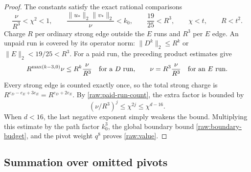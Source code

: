 \documentclass[11pt]{amsart}
\theoremstyle{definition}
\theoremstyle{remark}
\numberwithin{equation}{section}
\begin{document}
\begin{proof}
The constants satisfy the exact rational comparisons
\[
 \frac{\nu}{R^3}<\chi^2<1,\qquad
 \frac{\|u_*\|_2\|v_*\|_2}{\nu}<k_0,\qquad
 \frac{19}{25}<R^3,\qquad \chi<t,\qquad R<t^2.
\]
Charge $R$ per ordinary strong edge outside the $E$ runs and $R^3$
per $E$ edge.  An unpaid run is covered by its operator norm:
$\|D^k\|_2\le R^k$ or $\|E\|_2<19/25<R^3$.
For a paid run, the preceding product estimates give
\[
 R^{\max(k-3,0)}\nu\le R^k\frac{\nu}{R^3}
 \quad\hbox{for a $D$ run},\qquad
 \nu=R^3\frac{\nu}{R^3}\quad\hbox{for an $E$ run}.
\]
Every strong edge is counted exactly once, so the total strong charge is
$R^{e_D-e_E+3e_E}=R^{e_D+2e_E}$.
By \eqref{raw:paid-run-count}, the extra factor is bounded by
\[
 (\nu/R^3)^j\le\chi^{2j}\le\chi^{d-16}.
\]
When $d<16$, the last negative exponent simply weakens the bound.
Multiplying this estimate by the path factor $k_0^3$, the global
boundary bound \eqref{raw:boundary-budget}, and the pivot weight $q^8$
proves \eqref{raw:value}.
\end{proof}

\subsection{Summation over omitted pivots}
\end{document}
